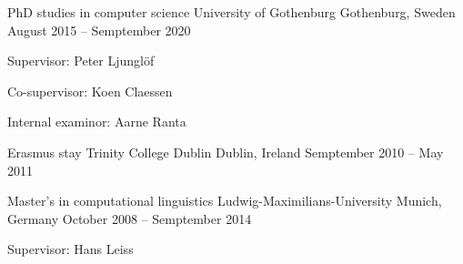 \documentclass[11pt, a4]{academic-cv}
\begin{document}
\begin{cventries}
\cventry
{PhD studies in computer science} %
{ University of Gothenburg} %
{Gothenburg, Sweden} %
{August 2015 -- Semptember 2020} %
{
\begin{cvitems} %
\item Supervisor: Peter Ljunglöf
\item Co-supervisor: Koen Claessen
\item Internal examinor: Aarne Ranta
\end{cvitems}
}

\cventry
{Erasmus stay} %
{ Trinity College Dublin} %
{Dublin, Ireland} %
{Semptember 2010 -- May 2011} %
{
}

\cventry
{Master's in computational linguistics} %
{ Ludwig-Maximilians-University} %
{Munich, Germany} %
{October 2008 -- Semptember 2014} %
{
\begin{cvitems} %
\item Supervisor: Hans Leiss
\end{cvitems}
}

\end{cventries}
\vspace{-10px}
\end{document}
